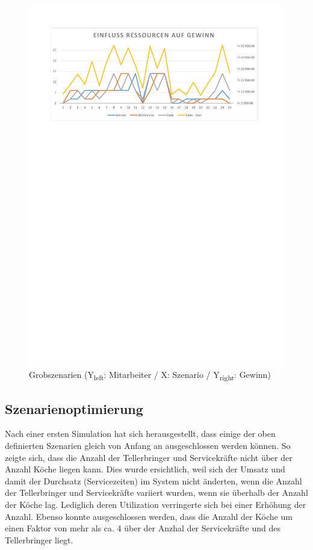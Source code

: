 \documentclass[ngerman,a4paper,12pt]{scrreprt}
\begin{document}
		\begin{figure}[H]
			\centering
				\includegraphics[trim=2cm 22.75cm 2cm 2cm, clip=true,width=\textwidth]{../Auswertung/1_groberOptimumBereich.pdf}
				\caption[Grobszenarien]{Grobszenarien (Y\textsubscript{left}: Mitarbeiter / X: Szenario / Y\textsubscript{right}: Gewinn)}
				\label{grobszenarien}
		\end{figure}
		
			
		\subsection{Szenarienoptimierung}
		Nach einer ersten Simulation hat sich herausgestellt, dass einige der oben definierten Szenarien gleich von Anfang an ausgeschlossen werden können. So zeigte sich, dass die Anzahl der Tellerbringer und Servicekräfte nicht über der Anzahl Köche liegen kann. Dies wurde ersichtlich, weil sich der Umsatz und damit der Durchsatz (Servicezeiten) im System nicht änderten, wenn die Anzahl der Tellerbringer und Servicekräfte variiert wurden, wenn sie überhalb der Anzahl der Köche lag. Lediglich deren Utilization verringerte sich bei einer Erhöhung der Anzahl.
		 Ebenso konnte ausgeschlossen werden, dass die Anzahl der Köche um einen Faktor von mehr als ca. 4 über der Anzhal der Servicekräfte und des Tellerbringer liegt.  
		
\end{document}
